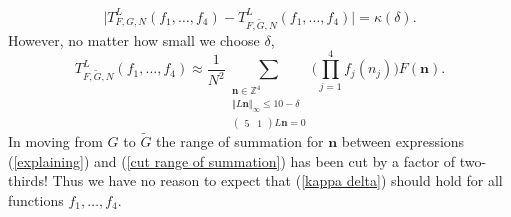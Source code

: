 \documentclass[12pt,a4paper,twoside,reqno]{amsart}
\numberwithin{equation}{section}
\begin{document}
\begin{equation}
\label{kappa delta}
\vert T_{F,G,N}^L(f_1,\dots,f_4) - T_{F,\widetilde{G},N}^L(f_1,\dots,f_4)\vert = \kappa(\delta).
\end{equation} However, no matter how small we choose $\delta$, 
\begin{equation}
\label{cut range of summation}
 T_{F, \widetilde{G},N}^L(f_1,\dots,f_4) \approx \frac{1}{N^2} \sum\limits_{\substack{\mathbf{n} \in \mathbb{Z}^4 \\ \Vert L \mathbf{n}\Vert_\infty \leqslant 10 - \delta \\ (\begin{smallmatrix}5 & 1 \end{smallmatrix})L\mathbf{n} = 0}}\Big(\prod\limits_{j=1}^4 f_j(n_j)\Big) F(\mathbf{n}).
 \end{equation} In moving from $G$ to $\widetilde{G}$ the range of summation for $\mathbf{n}$ between expressions (\ref{explaining}) and (\ref{cut range of summation}) has been cut by a factor of two-thirds! Thus we have no reason to expect that (\ref{kappa delta}) should hold for all functions $f_1,\dots,f_4$.\\
\end{document}
